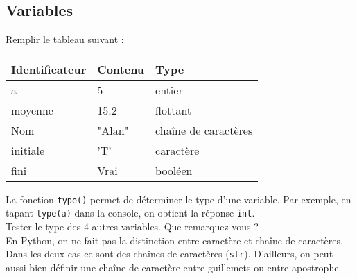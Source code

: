 \setcounter{subsection}{1}
\subsection{Variables}
\begin{cor}
Remplir le tableau suivant :\\
\begin{tabularx}{\textwidth}{|X|X|X|}
\hline
Identificateur & Contenu & Type \\
\hline
a & 5 & entier\\
\hline
moyenne & 15.2 & flottant \\
\hline
Nom & "Alan" & chaîne de caractères\\
\hline
initiale & 'T' & caractère\\
\hline
fini & Vrai & booléen\\
\hline
\end{tabularx}
\end{cor}

\begin{cor}[Python]
La fonction \texttt{type()} permet de déterminer le type d'une variable. Par exemple, en tapant \texttt{type(a)} dans la console, on obtient la réponse \texttt{int}.\\
Tester le type des 4 autres variables. Que remarquez-vous ?\\
En Python, on ne fait pas la distinction entre caractère et chaîne de caractères. Dans les deux cas ce sont des chaînes de caractères (\texttt{str}). D'ailleurs, on peut aussi bien définir une chaîne de caractère entre guillemets ou entre apostrophe.
\end{cor}

